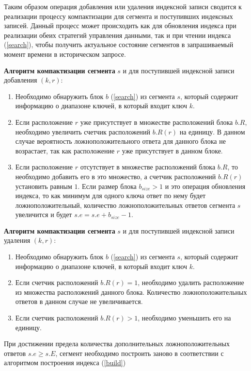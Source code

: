 Таким образом операция добавления или удаления индексной записи сводится к реализации процессу компактизации для сегмента и поступивших индексных записей. Данный процесс может происходить как для обновления индекса при реализации обеих стратегий управления данными, так и при чтении индекса (\ref{search}), чтобы получить актуальное состояние сегментов в запрашиваемый момент времени в историческом запросе.

\textbf{Алгоритм компактизации сегмента} $s$ и для поступившей индексной записи добавления $(k, r)$:
\begin{enumerate}
\item Необходимо обнаружить блок $b$ (\ref{search}) из сегмента $s$, который содержит информацию о диапазоне ключей, в который входит ключ $k$.
\item Если расположение $r$ уже присутствует в множестве расположений блока $b.R$, необходимо увеличить счетчик расположений $b.R(r)$ на единицу. В данном случае вероятность ложноположительного ответа для данного блока не возрастает, так как расположение $r$ уже присутствует в данном блоке.
\item Если расположение $r$ отсутствует в множестве расположений блока $b.R$, то необходимо добавить его в это множество, а счетчик расположений $b.R(r)$ установить равным $1$. Если размер блока $b_{size} > 1$ и это операция обновления индекса, то как минимум для одного ключа ответ по нему будет ложноположительный, количество ложноположительных ответов сегмента $s$ увеличится и будет $s.e = s.e + b_{size} - 1$.   
\end{enumerate}

\textbf{Алгоритм компактизации сегмента} $s$ и для поступившей индексной записи удаления $(k, r)$:
\begin{enumerate}
\item Необходимо обнаружить блок $b$ (\ref{search}) из сегмента $s$, который содержит информацию о диапазоне ключей, в который входит ключ $k$.
\item Если счетчик расположений $b.R(r) = 1$, необходимо удалить расположение из множества расположений данного блока. Количество ложноположительных ответов в данном случае не увеличивается.
\item Если счетчик расположений $b.R(r) > 1$, необходимо уменьшить его на единицу. 
\end{enumerate}

При достижении предела количества дополнительных ложноположительных ответов $s.e \geq s.E$, сегмент необходимо построить заново в соответствии с алгоритмом построения индекса (\ref{build})
